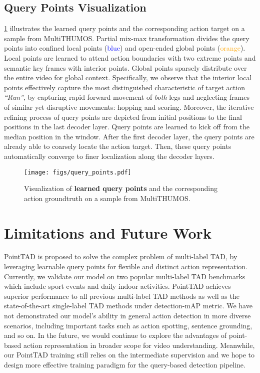 \documentclass{article}
\begin{document}
\subsection{Query Points Visualization}
\vspace{-0.5em}
\cref{fig:query_points} illustrates the learned query points and the corresponding action target on a sample from MultiTHUMOS. Partial mix-max transformation divides the query points into confined local points (\textcolor{blue}{blue}) and open-ended global points (\textcolor{orange}{orange}). Local points are learned to attend action boundaries with two extreme points and semantic key frames with interior points. Global points sparsely distribute over the entire video for global context. Specifically, we observe that the interior local points effectively capture the most distinguished characteristic of target action {\em ``Run''}, by capturing rapid forward movement of {\em both} legs and neglecting frames of similar yet disruptive movements: hopping and scoring. Moreover, the iterative refining process of query points are depicted from initial positions to the final positions in the last decoder layer. Query points are learned to kick off from the median position in the window. After the first decoder layer, the query points are already able to coarsely locate the action target. Then, these query points automatically converge to finer localization along the decoder layers.

\begin{figure}
  \centering
  \vspace{-4mm}
  \texttt{[image: figs/query\_points.pdf]}
  \caption{Visualization of {\bf learned query points} and the corresponding action groundtruth on a sample from MultiTHUMOS. }
  \label{fig:query_points}
  \vspace{-5mm}
\end{figure}

\vspace{-0.5em}
\section{Limitations and Future Work}
\label{sec:limitation}
\vspace{-0.5em}
PointTAD is proposed to solve the complex problem of multi-label TAD, by leveraging learnable query points for flexible and distinct action representation. Currently, we validate our model on two popular multi-label TAD benchmarks which include sport events and daily indoor activities. PointTAD achieves superior performance to all previous multi-label TAD methods as well as the state-of-the-art single-label TAD methods under detection-mAP metric. We have not demonstrated our model’s ability in general action detection in more diverse scenarios, including important tasks such as action spotting, sentence grounding, and so on. In the future, we would continue to explore the advantages of point-based action representation in broader scope for video understanding. Meanwhile, our PointTAD training still relies on the intermediate supervision and we hope to design more effective training paradigm for the query-based detection pipeline.
\end{document}
